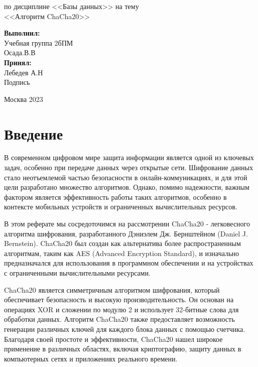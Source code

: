 \documentclass[12pt]{article}
\begin{document}
\begin{titlepage}
\begin{center}
            по дисциплине <<Базы данных>>
            на тему\\
            <<Алгоритм ChaCha20>>
        \end{center}

        \vspace{5cm}
        \hfill \begin{minipage}{0.5\linewidth}
                   \raggedleft
                   \textbf{Выполнил:}\\
                   Учебная группа 2бПМ\\
                   Осада.В.В\\
                   \textbf{Принял:}\\
                   Лебедев А.Н\\
                   Подпись \underline{\hspace{1cm}}\\
        \end{minipage}

        \vfill

        \begin{center}
            Москва 2023
        \end{center}
    \end{titlepage}

    \tableofcontents
    \newpage


    \section{Введение}

    В современном цифровом мире защита информации является одной из ключевых задач, особенно при передаче данных через открытые сети.
    Шифрование данных стало неотъемлемой частью безопасности в онлайн-коммуникациях, и для этой цели разработано множество алгоритмов.
    Однако, помимо надежности, важным фактором является эффективность работы таких алгоритмов, особенно в контексте мобильных устройств и ограниченных вычислительных ресурсов.

    В этом реферате мы сосредоточимся на рассмотрении ChaCha20 - легковесного алгоритма шифрования, разработанного Дэниэлем Дж. Бернштейном (Daniel J. Bernstein).
    ChaCha20 был создан как альтернатива более распространенным алгоритмам, таким как AES (Advanced Encryption Standard), и изначально предназначался для использования в программном обеспечении и на устройствах с ограниченными вычислительными ресурсами.

    ChaCha20 является симметричным алгоритмом шифрования, который обеспечивает безопасность и высокую производительность.
    Он основан на операциях XOR и сложении по модулю 2 и использует 32-битные слова для обработки данных.
    Алгоритм ChaCha20 также предоставляет возможность генерации различных ключей для каждого блока данных с помощью счетчика.
    Благодаря своей простоте и эффективности, ChaCha20 нашел широкое применение в различных областях, включая криптографию, защиту данных в компьютерных сетях и приложениях реального времени.
\end{document}

